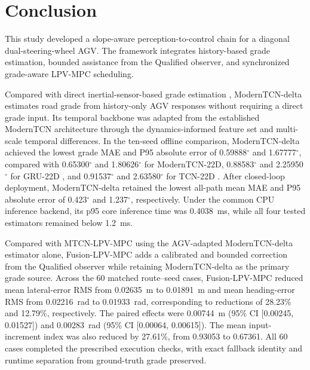 \documentclass{ieeeaccess}
\newcommand{\citep}[1]{\cite{#1}}
\begin{document}
\section{Conclusion}
\label{sec:conclusion}


This study developed a slope-aware perception-to-control chain for a diagonal
dual-steering-wheel AGV. The framework integrates history-based grade
estimation, bounded assistance from the Qualified observer, and synchronized
grade-aware LPV-MPC scheduling.

Compared with direct inertial-sensor-based grade estimation
\citep{Jauch2018IMUGradeOrientation,Li2022QuaternionUKFGrade,
Kim2023InertialRoadPitch}, ModernTCN-delta estimates road grade from
history-only AGV responses without requiring a direct grade input. Its temporal
backbone was adapted from the established ModernTCN architecture
\citep{Luo2024ModernTCN} through the dynamics-informed feature set and
multi-scale temporal differences. In the ten-seed offline comparison,
ModernTCN-delta achieved the lowest grade MAE and P95 absolute error of
0.59888$^{\circ}$ and 1.67777$^{\circ}$, compared with 0.65300$^{\circ}$ and
1.80626$^{\circ}$ for ModernTCN-22D, 0.88583$^{\circ}$ and
2.25950$^{\circ}$ for GRU-22D \citep{Cho2014GRU}, and 0.91537$^{\circ}$ and
2.63580$^{\circ}$ for TCN-22D \citep{Bai2018TCN}. After
closed-loop deployment, ModernTCN-delta retained the lowest all-path mean MAE
and P95 absolute error of 0.423$^{\circ}$ and 1.237$^{\circ}$, respectively.
Under the common CPU inference backend, its p95 core inference time was
0.4038~ms, while all four tested estimators remained below 1.2~ms.

Compared with MTCN-LPV-MPC using the AGV-adapted ModernTCN-delta estimator
alone, Fusion-LPV-MPC adds a calibrated and bounded correction from the
Qualified observer while retaining ModernTCN-delta as the primary grade source.
Across the 60 matched route--seed cases, Fusion-LPV-MPC reduced mean
lateral-error RMS from 0.02635~m to 0.01891~m and mean heading-error RMS from
0.02216~rad to 0.01933~rad, corresponding to reductions of 28.23\% and
12.79\%, respectively. The paired effects were 0.00744~m (95\% CI [0.00245,
0.01527]) and 0.00283~rad (95\% CI [0.00064, 0.00615]). The mean
input-increment index was also reduced by 27.61\%, from 0.93053 to 0.67361.
All 60 cases completed the prescribed execution checks, with exact fallback
identity and runtime separation from ground-truth grade preserved.
\end{document}
